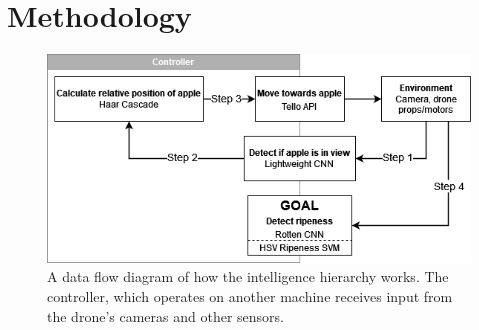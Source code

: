 \section{Methodology}

\begin{figure}[htbp]
    \fontsize{7}{5}\selectfont
    \centering
    \includegraphics[width=\columnwidth,keepaspectratio]
    {./figures/fruit-fly-model-diagram}
    \caption{
        A data flow diagram of how the intelligence hierarchy works.
        The controller, which operates on another machine receives input from the drone's cameras and other sensors.
    }
    \label{fig:fruit-fly-model-diagram}
\end{figure}




